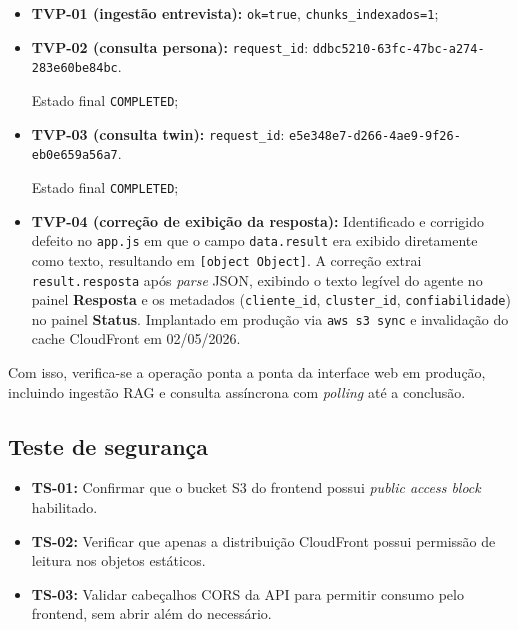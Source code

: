 \begin{itemize}[leftmargin=*]
  \item \textbf{TVP-01 (ingest\~ao entrevista):}
        \texttt{ok=true}, \texttt{chunks\_indexados=1};
  \item \textbf{TVP-02 (consulta persona):}
        \texttt{request\_id}: \nolinkurl{ddbc5210-63fc-47bc-a274-283e60be84bc}. \par
        Estado final \texttt{COMPLETED};
  \item \textbf{TVP-03 (consulta twin):}
        \texttt{request\_id}: \nolinkurl{e5e348e7-d266-4ae9-9f26-eb0e659a56a7}. \par
        Estado final \texttt{COMPLETED};
  \item \textbf{TVP-04 (corre\c{c}\~ao de exibi\c{c}\~ao da resposta):}
        Identificado e corrigido defeito no \texttt{app.js} em que o campo
        \texttt{data.result} era exibido diretamente como texto, resultando
        em \texttt{[object Object]}. A corre\c{c}\~ao extrai
        \texttt{result.resposta} ap\'os \textit{parse} JSON, exibindo o
        texto leg\'ivel do agente no painel \textbf{Resposta} e os metadados
        (\texttt{cliente\_id}, \texttt{cluster\_id}, \texttt{confiabilidade})
        no painel \textbf{Status}. Implantado em produ\c{c}\~ao via
        \texttt{aws s3 sync} e invalida\c{c}\~ao do cache CloudFront em
        02/05/2026.
\end{itemize}

Com isso, verifica-se a opera\c{c}\~ao ponta a ponta da interface web em
produ\c{c}\~ao, incluindo ingest\~ao RAG e consulta ass\'incrona com
\textit{polling} at\'e a conclus\~ao.

\subsection{Teste de seguran\c{c}a}

\begin{itemize}[leftmargin=*]
  \item \textbf{TS-01:} Confirmar que o bucket S3 do frontend possui
        \textit{public access block} habilitado.
  \item \textbf{TS-02:} Verificar que apenas a distribui\c{c}\~ao CloudFront
        possui permiss\~ao de leitura nos objetos est\'aticos.
  \item \textbf{TS-03:} Validar cabe\c{c}alhos CORS da API para
        permitir consumo pelo frontend, sem abrir al\'em do necess\'ario.
\end{itemize}

